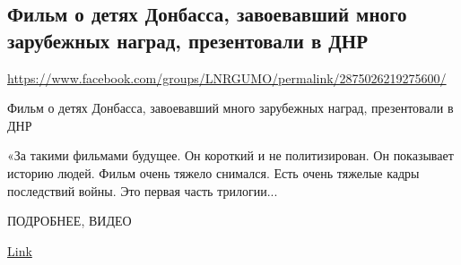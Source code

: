  
 
\subsection{Фильм о детях Донбасса, завоевавший много зарубежных наград, презентовали в ДНР}
\label{sec:25_07_2020.fb.lnr.3}
\url{https://www.facebook.com/groups/LNRGUMO/permalink/2875026219275600/}


Фильм о детях Донбасса, завоевавший много зарубежных наград, презентовали в ДНР

«За такими фильмами будущее. Он короткий и не политизирован. Он показывает
историю людей. Фильм очень тяжело снимался. Есть очень тяжелые кадры
последствий войны. Это первая часть трилогии...

ПОДРОБНЕЕ, ВИДЕО

\href{https://l.facebook.com/l.php?u=https%
}{Link}
  
